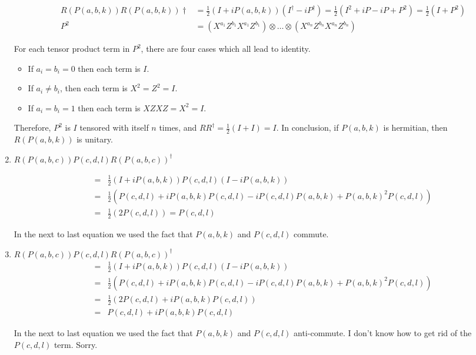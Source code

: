 \documentclass[12pt]{article}
\begin{document}
\begin{enumerate}
\begin{eqnarray*}
& R(P(a,b,k))R(P(a,b,k))\dagger & = \frac{1}{2}(I + iP(a,b,k))(I^\dagger -iP^\dagger) = \frac{1}{2}(I^2 +iP - iP + P^2) = \frac{1}{2}(I + P^2)\\
& P^2 & = (X^{a_1}Z^{b_1}X^{a_1}Z^{b_1})\otimes \ldots \otimes (X^{a_n}Z^{b_n}X^{a_n}Z^{b_n})
\end{eqnarray*}

For each tensor product term in $P^2$, there are four cases which all lead
to identity.

\begin{itemize}
\item
If $a_i = b_i = 0$ then each term is $I$.
\item
If $a_i \ne b_i$, then each term is $X^2 = Z^2 = I$.
\item
If $a_i = b_i = 1$ then each term is $XZXZ = X^2 = I$.
\end{itemize}

Therefore, $P^2$ is $I$ tensored with itself $n$ times, and
$RR^\dagger = \frac{1}{2}(I + I) = I$.
In conclusion, if $P(a,b,k)$ is hermitian, then $R(P(a,b,k))$ is unitary.

\item
$R(P(a,b,c))P(c,d,l)R(P(a,b,c))^\dagger$

\begin{eqnarray*}
& = & \frac{1}{2}(I + iP(a,b,k))P(c,d,l)(I-iP(a,b,k))\\
& = & \frac{1}{2}(P(c,d,l) + iP(a,b,k)P(c,d,l) - iP(c,d,l)P(a,b,k) + P(a,b,k)^2P(c,d,l))\\
& = & \frac{1}{2}(2P(c,d,l)) = P(c,d,l)
\end{eqnarray*}

In the next to last equation we used the fact that $P(a,b,k)$ and
$P(c,d,l)$ commute.

\item
$R(P(a,b,c))P(c,d,l)R(P(a,b,c))^\dagger$\\
\begin{eqnarray*}
& = & \frac{1}{2}(I + iP(a,b,k))P(c,d,l)(I-iP(a,b,k)) \\
& = &\frac{1}{2}(P(c,d,l) + iP(a,b,k)P(c,d,l) - iP(c,d,l)P(a,b,k) + P(a,b,k)^2P(c,d,l))\\
& = & \frac{1}{2}(2P(c,d,l) + iP(a,b,k)P(c,d,l)) \\
& = & P(c,d,l) + iP(a,b,k)P(c,d,l)
\end{eqnarray*}

In the next to last equation we used the fact that $P(a,b,k)$ and
$P(c,d,l)$ anti-commute. I don't know how to get rid of the
$P(c,d,l)$ term. Sorry.


\end{enumerate}
\end{document}
